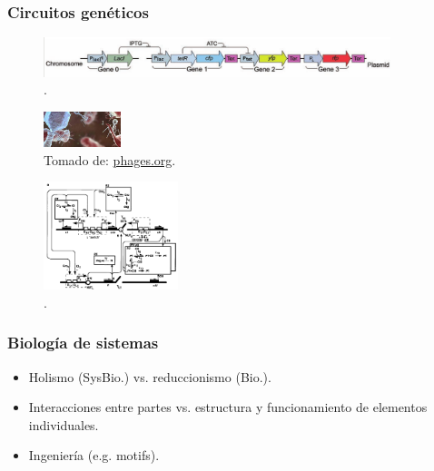 \documentclass[10pt]{beamer}
\begin{document}
\begin{frame}
\frametitle{Circuitos gen\'eticos}

\begin{figure}[p]
    \centering
    \includegraphics[width=0.9\textwidth]{circuitex.png}\\
    \tiny \cite{pedraza05}.
\end{figure}

\begin{figure}[p]
    \centering
    \includegraphics[width=0.2\textwidth]{phageim.jpg}\\
    \tiny Tomado de: \url{phages.org}.
\end{figure}

\begin{figure}[p]
    \centering
    \includegraphics[width=0.35\textwidth]{lambdacirc.png}\\
    \tiny \cite{arkin98}.
\end{figure}

\end{frame}

\begin{frame}
\frametitle{Biolog\'ia de sistemas}
\begin{itemize}
\item Holismo (SysBio.) vs. reduccionismo (Bio.).
\item Interacciones entre partes  vs. estructura y funcionamiento de elementos individuales.
\item Ingenier\'ia (e.g. motifs).
\end{itemize}
\end{frame}
\end{document}
